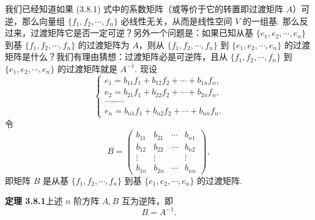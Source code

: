 \documentclass[UTF8, 12pt, fontset=fandol, oneside]{ctexart}
\begin{document}
我们已经知道如果 (3.8.1) 式中的系数矩阵（或等价于它的转置即过渡矩阵 $A$）可逆，那么向量组 $\{f_1,f_2,\cdots,f_n\}$ 必线性无关，从而是线性空间 $V$ 的一组基. 那么反过来，过渡矩阵它是否一定可逆？另外一个问题是：如果已知从基 $\{e_1,e_2,\cdots,e_n\}$ 到基 $\{f_1,f_2,\cdots,f_n\}$ 的过渡矩阵为 $A$，则从 $\{f_1,f_2,\cdots,f_n\}$ 到 $\{e_1,e_2,\cdots,e_n\}$ 的过渡矩阵是什么？我们有理由猜想：过渡矩阵必是可逆阵，且从 $\{f_1,f_2,\cdots,f_n\}$ 到 $\{e_1,e_2,\cdots,e_n\}$ 的过渡矩阵就是 $A^{-1}$. 现设
\begin{equation}
\left\{\begin{array}{l}
e_1=b_{11}f_1+b_{12}f_2+\cdots+b_{1n}f_n,\\
e_2=b_{21}f_1+b_{22}f_2+\cdots+b_{2n}f_n,\\
\cdots\cdots\cdots\\
e_n=b_{n1}f_1+b_{n2}f_2+\cdots+b_{nn}f_n.
\end{array}\right.
\tag{3.8.4}
\end{equation}
令
\[
B=\left(\begin{array}{cccc}
b_{11}&b_{21}&\cdots&b_{n1}\\
b_{12}&b_{22}&\cdots&b_{n2}\\
\vdots&\vdots&&\vdots\\
b_{1n}&b_{2n}&\cdots&b_{nn}
\end{array}\right),
\]
即矩阵 $B$ 是从基 $\{f_1,f_2,\cdots,f_n\}$ 到基 $\{e_1,e_2,\cdots,e_n\}$ 的过渡矩阵.

\noindent\textbf{定理 3.8.1}\quad 上述 $n$ 阶方阵 $A,B$ 互为逆阵，即
\[
B=A^{-1}.
\]
\end{document}
